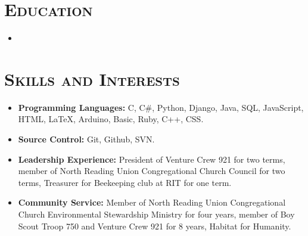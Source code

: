 \documentclass[10pt,letter,roman]{moderncv}
\begin{document}
\section{\textsc{Education}}

\begin{itemize}
\item{}
\end{itemize}

\vspace{2pt}

\section{\textsc{Skills and Interests}}

\begin{itemize}

\item \textbf{Programming Languages:} C, C\#, Python, Django, Java, SQL, JavaScript, HTML, LaTeX, Arduino, Basic, Ruby, C++, CSS.
\vspace{3pt}
\item \textbf{Source Control:} Git, Github, SVN.
\vspace{3pt}
\item \textbf{Leadership Experience:} President of Venture Crew 921 for two terms, member of North Reading Union Congregational Church Council for two terms, Treasurer for Beekeeping club at RIT for one term.
\vspace{3pt}
\item \textbf{Community Service:} Member of North Reading Union Congregational Church Environmental Stewardship Ministry for four years, member of Boy Scout Troop 750 and Venture Crew 921 for 8 years, Habitat for Humanity.

\end{itemize}
\end{document}
